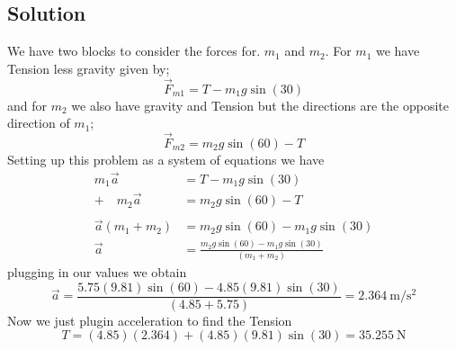 \documentclass{article}
\begin{document}
\subsection*{Solution}
We have two blocks to consider the forces for. $m_1$ and $m_2$. For $m_1$ we have Tension less gravity given by;
\[
	\vec{F}_{m1} = T - m_1 g \sin(30)
\]
and for $m_2$ we also have gravity and Tension but the directions are the opposite direction of $m_1$;
\[
	\vec{F}_{m2} = m_2 g \sin(60) - T
\]
Setting up this problem as a system of equations we have
\begin{align*}
	m_1 \vec{a} &= T - m_1 g \sin(30) \\
	+ \quad m_2 \vec{a} &= m_2 g \sin(60) - T\\
			    \\
	\vec{a}\left(m_1 + m_2\right) &= m_2 g \sin(60) - m_1 g \sin(30) \\
	\vec{a} &= \frac{m_2 g \sin(60) - m_1 g \sin(30)}{(m_1 + m_2)}
\end{align*}
plugging in our values we obtain
\[
	\vec{a} = \frac{5.75 (9.81) \sin(60) - 4.85 (9.81) \sin(30)}{(4.85 + 5.75)} =  \boxed{2.364\ \text{m}/\text{s}^2}
\]
Now we just plugin acceleration to find the Tension
\[
	T = (4.85) (2.364) + (4.85) (9.81) \sin(30) = \boxed{35.255\ \text{N}}
\]
\end{document}
